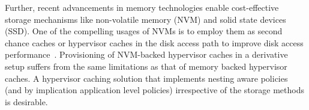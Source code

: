 %
%
% 
%
Further, recent advancements in memory technologies enable cost-effective
storage mechanisms like non-volatile memory (NVM) and solid state
devices (SSD).
%
One of the compelling usages of NVMs is to employ them
as second chance caches or hypervisor caches 
in the disk access path to improve disk access performance~\cite{extmem,sdc}.
%
%
%
Provisioning of NVM-backed hypervisor caches
in a derivative setup suffers from the same limitations as that
of memory backed hypervisor caches.
%
A hypervisor caching solution that implements
nesting aware policies (and by implication application level policies)
irrespective of the storage methods is desirable.
%
%
 


%


